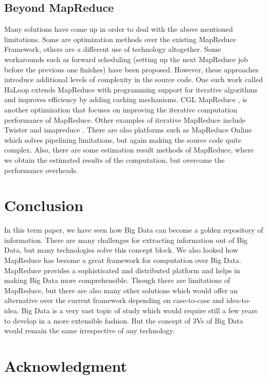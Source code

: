 \documentclass[journal]{IEEEtran}
\begin{document}
\subsection{Beyond MapReduce}
Many solutions have come up in order to deal with the above mentioned limitations. Some are optimization methods over the existing MapReduce Framework, others are a different use of technology altogether. Some workarounds such as forward scheduling (setting up the next MapReduce job before the previous one finishes) have been proposed. However, these approaches introduce additional levels of complexity in the source code. One such work called HaLoop \cite{bu2010haloop} extends MapReduce with programming support for iterative algorithms and improves efficiency by adding caching mechanisms. CGL MapReduce \cite{ekanayake2008mapreduce}, \cite{palit2012scalable} is another optimization that focuses on improving the iterative computation performance of MapReduce. Other examples of iterative MapReduce include Twister \cite{ekanayake2010twister} and imapreduce \cite{zhang2012imapreduce}. There are also platforms such as MapReduce Online \cite{condie2010mapreduce} which solves pipelining limitations, but again making the source code quite complex. Also, there are some estimation result methods of MapReduce, where we obtain the estimated results of the computation, but overcome the performance overheads.

\section{Conclusion}
In this term paper, we have seen how Big Data can become a golden repository of information. There are many challenges for extracting information out of Big Data, but many technologies solve this concept block. We also looked how MapReduce has become a great framework for computation over Big Data. MapReduce provides a sophisticated and distributed platform and helps in making Big Data more comprehensible. Though there are limitations of MapReduce, but there are also many other solutions which would offer an alternative over the current framework depending on case-to-case and idea-to-idea. Big Data is a very vast topic of study which would require still a few years to develop in a more extensible fashion. But the concept of 3Vs of Big Data would remain the same irrespective of any technology.

\section*{Acknowledgment}
\end{document}
